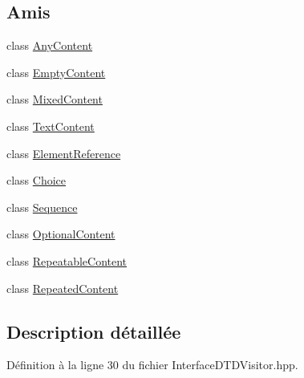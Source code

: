 \subsection*{Amis}
\begin{DoxyCompactItemize}
\item 
class \hyperlink{classdtd_1_1_interface_d_t_d_visitor_a98eaefc8d4a0da1a8f9c254c62a68759}{AnyContent}
\item 
class \hyperlink{classdtd_1_1_interface_d_t_d_visitor_a91eaa900fb18be6cd9a7105c964666fb}{EmptyContent}
\item 
class \hyperlink{classdtd_1_1_interface_d_t_d_visitor_a94c4de9fad580ef7aa4f384bf0c2b861}{MixedContent}
\item 
class \hyperlink{classdtd_1_1_interface_d_t_d_visitor_aa641efa971cba38c6181cdc71b30df90}{TextContent}
\item 
class \hyperlink{classdtd_1_1_interface_d_t_d_visitor_a21b7004458ebe5b88f6d6edb6d059a34}{ElementReference}
\item 
class \hyperlink{classdtd_1_1_interface_d_t_d_visitor_af8084f88f5641132057732496deab026}{Choice}
\item 
class \hyperlink{classdtd_1_1_interface_d_t_d_visitor_a26271d5afaff6e6d3f00c055c63d0b24}{Sequence}
\item 
class \hyperlink{classdtd_1_1_interface_d_t_d_visitor_a90839fb65068433fb68ba4e59462f869}{OptionalContent}
\item 
class \hyperlink{classdtd_1_1_interface_d_t_d_visitor_ad2e096c883291671a8d20ca270018e05}{RepeatableContent}
\item 
class \hyperlink{classdtd_1_1_interface_d_t_d_visitor_afaa2f3eab18d4215d1683c4b2f5a6b8e}{RepeatedContent}
\end{DoxyCompactItemize}


\subsection{Description détaillée}


Définition à la ligne 30 du fichier InterfaceDTDVisitor.hpp.




